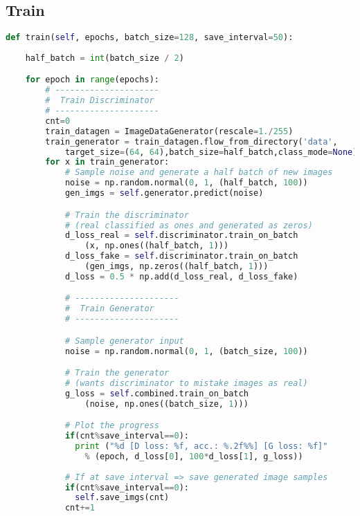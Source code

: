 

\subsection{Train} %
\label{subsec:train}
\begin{lstlisting}[basicstyle=\scriptsize,language=Python]
def train(self, epochs, batch_size=128, save_interval=50):
    
    half_batch = int(batch_size / 2)

    for epoch in range(epochs):
        # ---------------------
        #  Train Discriminator
        # ---------------------
        cnt=0
        train_datagen = ImageDataGenerator(rescale=1./255)
        train_generator = train_datagen.flow_from_directory('data',
            target_size=(64, 64),batch_size=half_batch,class_mode=None)
        for x in train_generator:
            # Sample noise and generate a half batch of new images
            noise = np.random.normal(0, 1, (half_batch, 100))
            gen_imgs = self.generator.predict(noise)

            # Train the discriminator 
            # (real classified as ones and generated as zeros)
            d_loss_real = self.discriminator.train_on_batch
                (x, np.ones((half_batch, 1)))
            d_loss_fake = self.discriminator.train_on_batch
                (gen_imgs, np.zeros((half_batch, 1)))
            d_loss = 0.5 * np.add(d_loss_real, d_loss_fake)

            # ---------------------
            #  Train Generator
            # ---------------------

            # Sample generator input
            noise = np.random.normal(0, 1, (batch_size, 100))

            # Train the generator 
            # (wants discriminator to mistake images as real)
            g_loss = self.combined.train_on_batch
                (noise, np.ones((batch_size, 1)))

            # Plot the progress
            if(cnt%save_interval==0):
              print ("%d [D loss: %f, acc.: %.2f%%] [G loss: %f]" 
                % (epoch, d_loss[0], 100*d_loss[1], g_loss))
            
            # If at save interval => save generated image samples
            if(cnt%save_interval==0):
              self.save_imgs(cnt)
            cnt+=1
\end{lstlisting}

